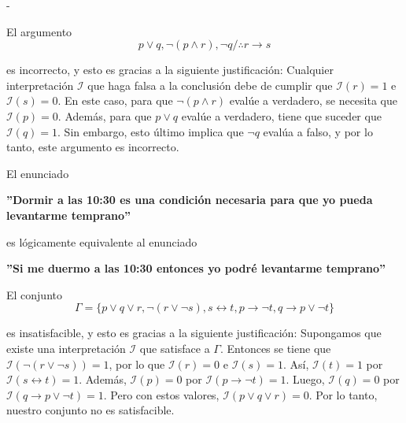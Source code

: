 \documentclass[12pt, a4paper]{exam}
\makeatletter
\renewenvironment{checkboxes}%
   {\setcounter{choice}{0}\list{\checkbox@char}%
      {%
        \settowidth{\leftmargin}{W.\hskip\labelsep\hskip 2.5em}%
        \def\choice{%
          \if@correctchoice
            \color@endgroup \endgroup
          \fi
          \stepcounter{choice}
          \item[\checked@char]
          \do@choice@pageinfo
        } %
        \def\CorrectChoice{%
          \if@correctchoice
            \color@endgroup \endgroup
          \fi
          \ifprintanswers
            \ifhmode \unskip\unskip\unvbox\voidb@x \fi
            \begingroup \color@begingroup \@correctchoicetrue
            \CorrectChoice@Emphasis
            \stepcounter{choice}
            \item[\checked@char]
          \else
            \stepcounter{choice}
            \item[\checked@char]
          \fi
          \do@choice@pageinfo
        } %
        \let\correctchoice\CorrectChoice
        \labelwidth\leftmargin\advance\labelwidth-\labelsep
        \topsep=0pt
        \partopsep=0pt
        \checkboxeshook
      }%
   }%
   {\if@correctchoice \color@endgroup \endgroup \fi \endlist}
\makeatother
\begin{document}
\begin{questions}
\begin{checkboxes}
            \choice El argumento 
            \begin{equation*}
                p \lor q, \neg (p \land r), \neg q / \therefore 
                r \rightarrow s
            \end{equation*}

            es incorrecto, y esto es gracias a la siguiente justificación: 
            Cualquier interpretación $\mathcal{I}$ que haga falsa a la 
            conclusión debe de cumplir que $\mathcal{I}(r) = 1$ e 
            $\mathcal{I}(s) = 0$. En este caso, para que $\neg (p \land r)$
            evalúe a verdadero, se necesita que $\mathcal{I}(p) = 0$.
            Además, para que $p \lor q$ evalúe a verdadero, tiene que suceder 
            que $\mathcal{I}(q) = 1$. Sin embargo, esto último implica que 
            $\neg q$ evalúa a falso, y por lo tanto, este argumento es 
            incorrecto.

            \choice El enunciado 
            \begin{center}
                \textbf{''Dormir a las 10:30 es una condición necesaria para 
                que yo pueda levantarme temprano''}
            \end{center}

            es lógicamente equivalente al enunciado
            \begin{center}
                \textbf{''Si me duermo a las 10:30 entonces yo podré 
                levantarme temprano''}
            \end{center}

            \choice El conjunto 
            \begin{equation*}
                \Gamma = \{p \lor q \lor r, \neg (r \lor \neg s), 
                s \leftrightarrow t, p \rightarrow \neg t, q \rightarrow
                p \lor \neg t\}
            \end{equation*}

            es insatisfacible, y esto es gracias a la siguiente justificación: 
            Supongamos que existe una interpretación $\mathcal{I}$ que 
            satisface a $\Gamma$. Entonces se tiene que $\mathcal{I}(\neg (r 
            \lor \neg s)) = 1$, por lo que $\mathcal{I}(r) = 0$ e 
            $\mathcal{I}(s) = 1$. Así, $\mathcal{I}(t) = 1$ por 
            $\mathcal{I}(s \leftrightarrow t) = 1$. Además, $\mathcal{I}(p)
            = 0$ por $\mathcal{I}(p \rightarrow \neg t) = 1$. Luego, 
            $\mathcal{I}(q) = 0$ por $\mathcal{I}(q \rightarrow p \lor \neg t)
            = 1$. Pero con estos valores, $\mathcal{I}(p \lor q \lor r) = 0$. 
            Por lo tanto, nuestro conjunto no es satisfacible. %
            

\end{checkboxes}
\end{questions}
\end{document}

